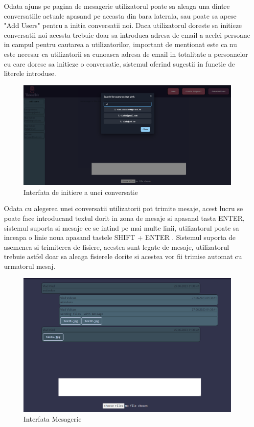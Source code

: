 \documentclass[12pt,a4paper,hidelinks]{report}
\theoremstyle{definition}
\theoremstyle{remark}
\begin{document}
Odata ajuns pe pagina de mesagerie utilizatorul poate sa aleaga una dintre conversatiile actuale
apasand pe aceasta din bara laterala, sau poate sa apese "Add Users" pentru a initia conversatii noi.
Daca utilizatorul doreste sa initieze conversatii noi acessta trebuie doar sa introduca adresa de email
a acelei persoane in campul pentru cautarea a utilizatorilor, important de mentionat este ca nu este necesar
ca utilizatorii sa cunoasca adresa de email in totalitate a persoanelor cu care doresc sa initieze o conversatie, 
sistemul oferind sugestii in functie de literele introduse.

\begin{figure}[H]
    \centering
    \includegraphics[scale=0.3]{images/AddUser.PNG}
    \caption{Interfata de initiere a unei conversatie}
\end{figure}
Odata cu alegerea unei conversatii utilizatorii pot trimite mesaje, acest lucru se poate face  
introducand textul dorit in zona de mesaje si apasand tasta ENTER,  
sistemul suporta si mesaje ce se intind pe mai multe linii, utilizatorul poate sa inceapa o linie noua apasand tastele SHIFT + ENTER
. Sistemul suporta de asemenea si trimiterea de fisiere, acestea sunt legate de mesaje, utilizatorul trebuie astfel doar sa aleaga
fisierele dorite si acestea vor fii trimise automat cu urmatorul mesaj.
\begin{figure}[H]
    \centering
    \includegraphics[scale=0.3]{images/SendMessages.PNG}
    \caption{Interfata Mesagerie}
\end{figure}
\end{document}
